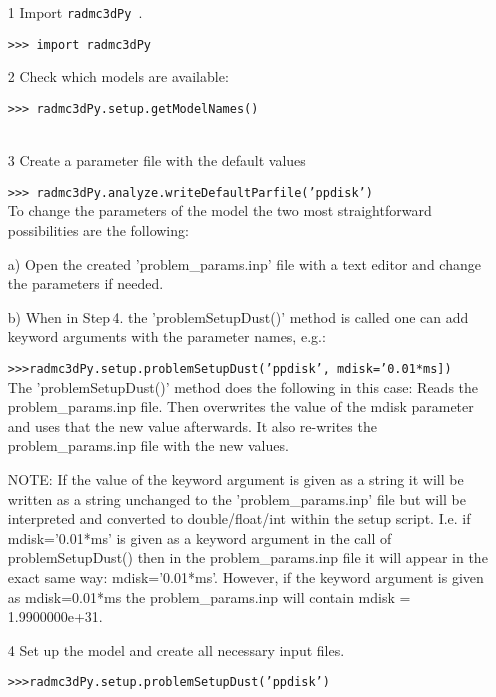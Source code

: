 \documentclass[12pt]{article}
\newcommand{\pymod}{{\tt  radmc3dPy }}
\begin{document}
\begin{itemize}
\item[1] Import \pymod.

{\tt >>> import radmc3dPy}\\
\item[2] Check which models are available:

{\tt >>> radmc3dPy.setup.getModelNames()}\\
\\
\item[3] Create a parameter file with the default values

{\tt >>> radmc3dPy.analyze.writeDefaultParfile('ppdisk')}\\


To change the parameters of the model the two most straightforward possibilities are the following:

a) Open the created 'problem\_params.inp' file with a text editor and change the parameters if needed. 

b) When in  Step\,4. the 'problemSetupDust()' method is called one can add keyword arguments with the parameter
names, e.g.:

{\tt>>>radmc3dPy.setup.problemSetupDust('ppdisk', mdisk='0.01*ms])}\\

The 'problemSetupDust()' method does the following in this case: Reads the problem\_params.inp file. Then 
overwrites the value of the mdisk parameter and uses that the new value afterwards. It also re-writes the problem\_params.inp
file with the new values. 

NOTE: If the value of the keyword argument is given as a string it will be written as a string unchanged to the 'problem\_params.inp' file
but will be interpreted and converted to double/float/int within the setup script. I.e. if mdisk='0.01*ms' is given as a keyword argument
in the call of problemSetupDust()  then in the problem\_params.inp file it will appear in the exact same way: mdisk='0.01*ms'. 
However, if the keyword argument is given as mdisk=0.01*ms the problem\_params.inp will contain mdisk = 1.9900000e+31. 


\item[4] Set up the model and create all necessary input files.


{\tt>>>radmc3dPy.setup.problemSetupDust('ppdisk')}\\


\end{itemize}
\end{document}
